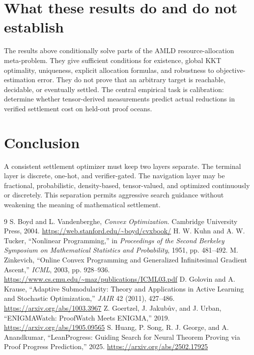 \documentclass[11pt]{article}
\begin{document}
\section{What these results do and do not establish}
The results above conditionally solve parts of the AMLD resource-allocation meta-problem. They give sufficient conditions for existence, global KKT optimality, uniqueness, explicit allocation formulas, and robustness to objective-estimation error. They do not prove that an arbitrary target is reachable, decidable, or eventually settled. The central empirical task is calibration: determine whether tensor-derived measurements predict actual reductions in verified settlement cost on held-out proof oceans.

\section{Conclusion}
A consistent settlement optimizer must keep two layers separate. The terminal layer is discrete, one-hot, and verifier-gated. The navigation layer may be fractional, probabilistic, density-based, tensor-valued, and optimized continuously or discretely. This separation permits aggressive search guidance without weakening the meaning of mathematical settlement.

\begin{thebibliography}{9}
 S. Boyd and L. Vandenberghe, \emph{Convex Optimization}. Cambridge University Press, 2004. \url{https://web.stanford.edu/~boyd/cvxbook/}
 H. W. Kuhn and A. W. Tucker, ``Nonlinear Programming,'' in \emph{Proceedings of the Second Berkeley Symposium on Mathematical Statistics and Probability}, 1951, pp. 481--492.
 M. Zinkevich, ``Online Convex Programming and Generalized Infinitesimal Gradient Ascent,'' \emph{ICML}, 2003, pp. 928--936. \url{https://www.cs.cmu.edu/~maz/publications/ICML03.pdf}
 D. Golovin and A. Krause, ``Adaptive Submodularity: Theory and Applications in Active Learning and Stochastic Optimization,'' \emph{JAIR} 42 (2011), 427--486. \url{https://arxiv.org/abs/1003.3967}
 Z. Goertzel, J. Jakub\r{u}v, and J. Urban, ``ENIGMAWatch: ProofWatch Meets ENIGMA,'' 2019. \url{https://arxiv.org/abs/1905.09565}
 S. Huang, P. Song, R. J. George, and A. Anandkumar, ``LeanProgress: Guiding Search for Neural Theorem Proving via Proof Progress Prediction,'' 2025. \url{https://arxiv.org/abs/2502.17925}
\end{thebibliography}
\end{document}
